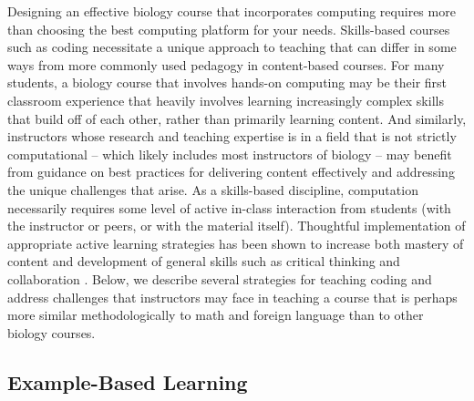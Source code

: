 
Designing an effective biology course that incorporates computing requires more than choosing the best computing platform for your needs. Skills-based courses such as coding necessitate a unique approach to teaching that can differ in some ways from more commonly used pedagogy in content-based courses. 
For many students, a biology course that involves hands-on computing may be their first classroom experience that heavily involves learning increasingly complex skills that build off of each other, rather than primarily learning content. And similarly, instructors whose research and teaching expertise is in a field that is not strictly computational -- which likely includes most instructors of biology -- may benefit from guidance on best practices for delivering content effectively and addressing the unique challenges that arise. As a skills-based discipline, computation 
necessarily requires some level of active in-class interaction from students (with the instructor or peers, or with the material itself). Thoughtful implementation of appropriate active learning strategies has been shown to increase both mastery of content and development of general skills such as critical thinking and collaboration \citep{faust_paulson_1998}. Below, we describe several strategies for teaching coding and address challenges that instructors may face in teaching a course that is perhaps more similar methodologically to math and foreign language than to other biology courses.

\subsection{Example-Based Learning}

